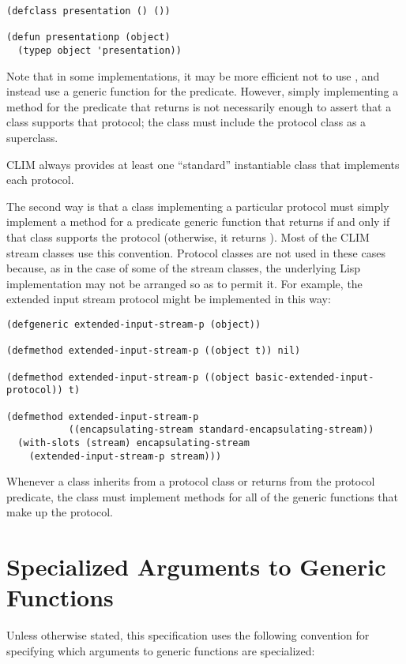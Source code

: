 \begin{verbatim}
(defclass presentation () ())

(defun presentationp (object)
  (typep object 'presentation))
\end{verbatim}

Note that in some implementations, it may be more efficient not to use
, and instead use a generic function for the predicate.  However,
simply implementing a method for the predicate that returns  is not
necessarily enough to assert that a class supports that protocol; the class must
include the protocol class as a superclass.

CLIM always provides at least one ``standard'' instantiable class that
implements each protocol.

The second way is that a class implementing a particular protocol must simply
implement a method for a predicate generic function that returns  if
and only if that class supports the protocol (otherwise, it returns
).  Most of the CLIM stream classes use this convention.  Protocol
classes are not used in these cases because, as in the case of some of the
stream classes, the underlying Lisp implementation may not be arranged so as to
permit it.  For example, the extended input stream protocol might be implemented
in this way:

\begin{verbatim}
(defgeneric extended-input-stream-p (object))

(defmethod extended-input-stream-p ((object t)) nil)

(defmethod extended-input-stream-p ((object basic-extended-input-protocol)) t)

(defmethod extended-input-stream-p
           ((encapsulating-stream standard-encapsulating-stream))
  (with-slots (stream) encapsulating-stream
    (extended-input-stream-p stream)))
\end{verbatim}

Whenever a class inherits from a protocol class or returns  from the
protocol predicate, the class must implement methods for all of the generic
functions that make up the protocol.


\section {Specialized Arguments to Generic Functions}

Unless otherwise stated, this specification uses the following convention
for specifying which arguments to generic functions are specialized:

